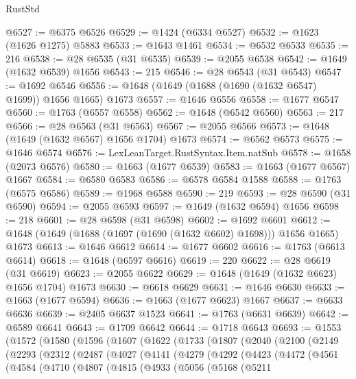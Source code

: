 \begin{lexlean}{RustStd}
\begin{coremodule}
@6527 := @6375 @6526
@6529 := @1424 (@6334 @6527)
@6532 := @1623 (@1626 @1275) @5883
@6533 := @1643 @1461
@6534 := @6532 @6533
@6535 := 216
@6538 := @28 @6535 (@31 @6535)
@6539 := @2055 @6538
@6542 := @1649 (@1632 @6539) @1656
@6543 := 215
@6546 := @28 @6543 (@31 @6543)
@6547 := @1692 @6546
@6556 := @1648 (@1649 (@1688 (@1690 (@1632 @6547) @1699)) @1656 @1665) @1673
@6557 := @1646 @6556
@6558 := @1677 @6547
@6560 := @1763 (@6557 @6558)
@6562 := @1648 (@6542 @6560)
@6563 := 217
@6566 := @28 @6563 (@31 @6563)
@6567 := @2055 @6566
@6573 := @1648 (@1649 (@1632 @6567) @1656 @1704) @1673
@6574 := @6562 @6573
@6575 := @1646 @6574
@6576 := LexLeanTarget.RustSyntax.Item.natSub
@6578 := @1658 (@2073 @6576)
@6580 := @1663 (@1677 @6539)
@6583 := @1663 (@1677 @6567) @1667
@6584 := @6580 @6583
@6586 := @6578 @6584 @1588
@6588 := @1763 (@6575 @6586)
@6589 := @1968 @6588
@6590 := 219
@6593 := @28 @6590 (@31 @6590)
@6594 := @2055 @6593
@6597 := @1649 (@1632 @6594) @1656
@6598 := 218
@6601 := @28 @6598 (@31 @6598)
@6602 := @1692 @6601
@6612 := @1648 (@1649 (@1688 (@1697 (@1690 (@1632 @6602) @1698))) @1656 @1665) @1673
@6613 := @1646 @6612
@6614 := @1677 @6602
@6616 := @1763 (@6613 @6614)
@6618 := @1648 (@6597 @6616)
@6619 := 220
@6622 := @28 @6619 (@31 @6619)
@6623 := @2055 @6622
@6629 := @1648 (@1649 (@1632 @6623) @1656 @1704) @1673
@6630 := @6618 @6629
@6631 := @1646 @6630
@6633 := @1663 (@1677 @6594)
@6636 := @1663 (@1677 @6623) @1667
@6637 := @6633 @6636
@6639 := @2405 @6637 @1523
@6641 := @1763 (@6631 @6639)
@6642 := @6589 @6641
@6643 := @1709 @6642
@6644 := @1718 @6643
@6693 := @1553
    (@1572
      (@1580
        (@1596
          (@1607
            (@1622
              (@1733
                (@1807
                  (@2040
                    (@2100
                      (@2149
                        (@2293
                          (@2312
                            (@2487
                              (@4027
                                (@4141
                                  (@4279
                                    (@4292
                                      (@4423
                                        (@4472
                                          (@4561
                                            (@4584
                                              (@4710
                                                (@4807
                                                  (@4815
                                                    (@4933
                                                      (@5056
                                                        (@5168
                                                          (@5211

\end{coremodule}
\end{lexlean}
